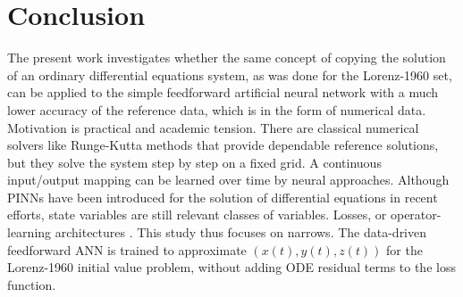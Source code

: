 \chapter{Conclusion}

The present work investigates whether the same concept of copying the solution of an ordinary differential equations system, as was done for the Lorenz-1960 set, can be applied to the simple feedforward artificial neural network with a much lower accuracy of the reference data, which is in the form of numerical data. Motivation is practical and academic tension. There are classical numerical solvers like Runge-Kutta methods that provide dependable reference solutions, but they solve the system step by step on a fixed grid. A continuous input/output mapping can be learned over time by neural approaches. Although PINNs have been introduced for the solution of differential equations in recent efforts, state variables are still relevant classes of variables. Losses, or operator-learning architectures \cite{matthews2024pinnde, babni2025error, lau2020oden}. This study thus focuses on narrows. The data-driven feedforward ANN is trained to approximate $(x(t), y(t), z(t))$ for the Lorenz-1960 initial value problem, without adding ODE residual terms to the loss function.


